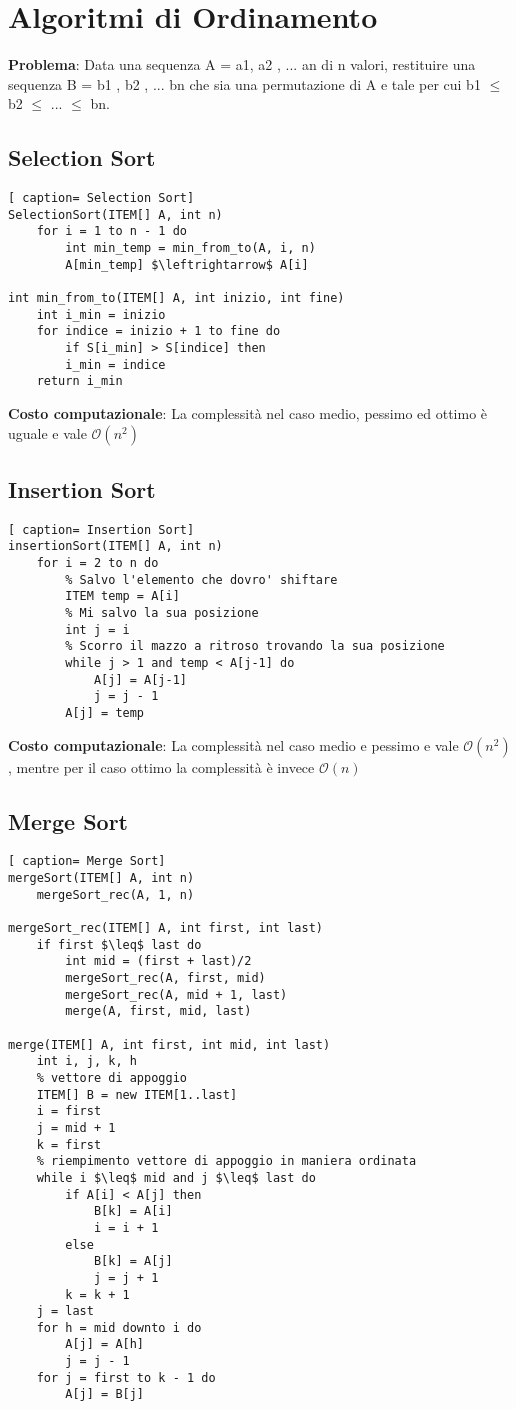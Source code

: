 \documentclass[../cheatSheetAlgoritmi.tex]{subfiles}
\begin{document}
\section{Algoritmi di Ordinamento}
\textbf{Problema}: Data una sequenza A = a1, a2 , ... an di n valori, restituire una sequenza B = b1 , b2 , ... bn che sia una permutazione di A e tale per cui b1 $\leq$ b2 $\leq$ ... $\leq$ bn.\
\subsection{Selection Sort}
\begin{lstlisting}[ caption= Selection Sort]
SelectionSort(ITEM[] A, int n)
	for i = 1 to n - 1 do
    	int min_temp = min_from_to(A, i, n)
    	A[min_temp] $\leftrightarrow$ A[i]

int min_from_to(ITEM[] A, int inizio, int fine)
	int i_min = inizio
  	for indice = inizio + 1 to fine do
    	if S[i_min] > S[indice] then
      	i_min = indice
  	return i_min
\end{lstlisting}
\textbf{Costo computazionale}: La complessità nel caso medio, pessimo ed ottimo è uguale e vale $\mathcal{O}(n^{2})$\

\subsection{Insertion Sort}
\begin{lstlisting}[ caption= Insertion Sort]
insertionSort(ITEM[] A, int n)
	for i = 2 to n do
    	% Salvo l'elemento che dovro' shiftare
    	ITEM temp = A[i]
    	% Mi salvo la sua posizione
    	int j = i
    	% Scorro il mazzo a ritroso trovando la sua posizione
    	while j > 1 and temp < A[j-1] do
      		A[j] = A[j-1]
      		j = j - 1
    	A[j] = temp
\end{lstlisting}
\textbf{Costo computazionale}: La complessità nel caso medio e pessimo  e vale $\mathcal{O}(n^{2})$, mentre per il caso ottimo la complessità è invece $\mathcal{O}(n)$ \
\newpage
\subsection{Merge Sort}
\begin{lstlisting}[ caption= Merge Sort]
mergeSort(ITEM[] A, int n)
	mergeSort_rec(A, 1, n)

mergeSort_rec(ITEM[] A, int first, int last)
  	if first $\leq$ last do
    	int mid = (first + last)/2
    	mergeSort_rec(A, first, mid)
    	mergeSort_rec(A, mid + 1, last)
    	merge(A, first, mid, last)

merge(ITEM[] A, int first, int mid, int last)
  	int i, j, k, h
  	% vettore di appoggio
  	ITEM[] B = new ITEM[1..last]
  	i = first
  	j = mid + 1
  	k = first
  	% riempimento vettore di appoggio in maniera ordinata
  	while i $\leq$ mid and j $\leq$ last do
    	if A[i] < A[j] then
     		B[k] = A[i]
      		i = i + 1
    	else  
      		B[k] = A[j]
      		j = j + 1
    	k = k + 1
  	j = last
  	for h = mid downto i do
  		A[j] = A[h]
  		j = j - 1
  	for j = first to k - 1 do
  		A[j] = B[j]
\end{lstlisting}
\end{document}
